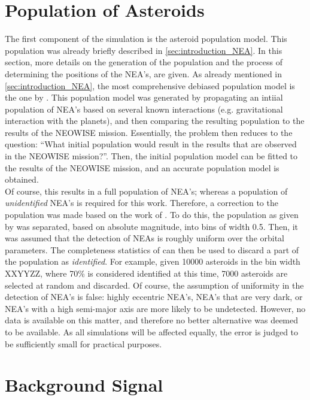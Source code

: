 \section{Population of Asteroids}
\label{sec:modelling_population}
The first component of the simulation is the asteroid population model. This population was already briefly described in \autoref{sec:introduction_NEA}. In this section, more details on the generation of the population and the process of determining the positions of the NEA's, are given. As already mentioned in \autoref{sec:introduction_NEA}, the most comprehensive debiased population model is the one by \cite{PopulationGranvik}. This population model was generated by propagating an intiial population of NEA's based on several known interactions (e.g. gravitational interaction with the planets), and then comparing the resulting population to the results of the NEOWISE mission. Essentially, the problem then reduces to the question: ``What initial population would result in the results that are observed in the NEOWISE mission?''. Then, the initial population model can be fitted to the results of the NEOWISE mission, and an accurate population model is obtained. \\

Of course, this results in a full population of NEA's; whereas a population of \textit{unidentified} NEA's is required for this work. Therefore, a correction to the population was made based on the work of \cite{PopulationHarris}. To do this, the population as given by \cite{PopulationGranvik} was separated, based on absolute magnitude, into bins of width 0.5. Then, it was assumed that the detection of NEAs is roughly uniform over the orbital parameters. The completeness statistics of \cite{PopulationHarris} can then be used to discard a part of the population as \textit{identified}. For example, given 10000 asteroids in the bin width XXYYZZ, where 70\% is considered identified at this time, 7000 asteroids are selected at random and discarded. Of course, the assumption of uniformity in the detection of NEA's is false: highly eccentric NEA's, NEA's that are very dark, or NEA's with a high semi-major axis are more likely to be undetected. However, no data is available on this matter, and therefore no better alternative was deemed to be available. As all simulations will be affected equally, the error is judged to be sufficiently small for practical purposes.

\section{Background Signal}
\label{sec:modelling_background}

